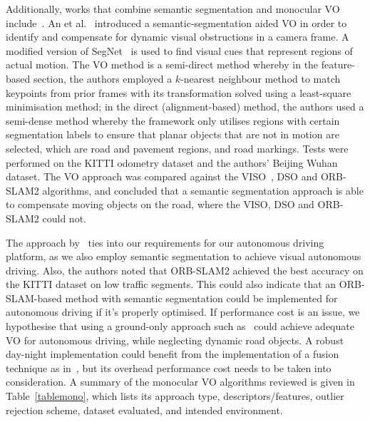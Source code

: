 Additionally, works that combine semantic segmentation and monocular VO include~\cite{ros_vision-based_2015, an_semantic_2017}. An et al.~\cite{an_semantic_2017} introduced a semantic-segmentation aided VO in order to identify and compensate for dynamic visual obstructions in a camera frame. A modified version of SegNet~\cite{badrinarayanan_segnet:_2017} is used to find visual cues that represent regions of actual motion. The VO method is a semi-direct method whereby in the feature-based section, the authors employed a $k$-nearest neighbour method to match keypoints from prior frames with its transformation solved using a least-square minimisation method; in the direct (alignment-based) method, the authors used a semi-dense method whereby the framework only utilises regions with certain segmentation labels to ensure that planar objects that are not in motion are selected, which are road and pavement regions, and road markings. Tests were performed on the KITTI odometry dataset and the authors' Beijing Wuhan dataset. The VO approach was compared against the VISO~\cite{geiger_stereoscan:_2011}, DSO and ORB-SLAM2 algorithms, and concluded that a semantic segmentation approach is able to compensate moving objects on the road, where the VISO, DSO and ORB-SLAM2 could not. 

The approach by~\cite{an_semantic_2017} ties into our requirements for our autonomous driving platform, as we also employ semantic segmentation to achieve visual autonomous driving. Also, the authors noted that ORB-SLAM2 achieved the best accuracy on the KITTI dataset on low traffic segments. This could also indicate that an ORB-SLAM-based method with semantic segmentation could be implemented for autonomous driving if it's properly optimised. If performance cost is an issue, we hypothesise that using a ground-only approach such as~\cite{lee_online_2015} could achieve adequate VO for autonomous driving, while neglecting dynamic road objects. A robust day-night implementation could benefit from the implementation of a fusion technique as in~\cite{sappa_monocular_2016}, but its overhead performance cost needs to be taken into consideration. A summary of the monocular VO algorithms reviewed is given in Table~\ref{tablemono}, which lists its approach type, descriptors/features, outlier rejection scheme, dataset evaluated, and intended environment.

